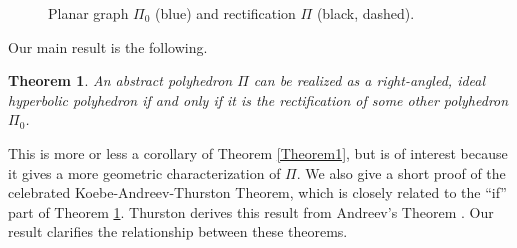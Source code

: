 \documentclass[11pt,letterpaper]{amsart}
\newtheorem{theorem}{Theorem}
\begin{document}
\begin{figure}[h]
\vspace{-.5cm}
\caption{Planar graph $\Pi_0$ (blue) and rectification $\Pi$ (black, dashed).}
\label{Figure1}
\end{figure}

Our main result is the following.
\begin{theorem} \label{Theorem2}
An abstract polyhedron $\Pi$ can be realized as a right-angled, ideal hyperbolic polyhedron if and only if it is the rectification of some other polyhedron $\Pi_0$. 
\end{theorem}
This is more or less a corollary of Theorem \ref{Theorem1}, but is of interest because it gives a more geometric characterization of $\Pi$.  We also give a short proof of the celebrated Koebe-Andreev-Thurston Theorem, which is closely related to the ``if'' part of Theorem \ref{Theorem2}. Thurston derives this result from Andreev's Theorem \cite[Corollary 13.6.2]{Thurston}. Our result clarifies the relationship between these theorems. 
\end{document}
